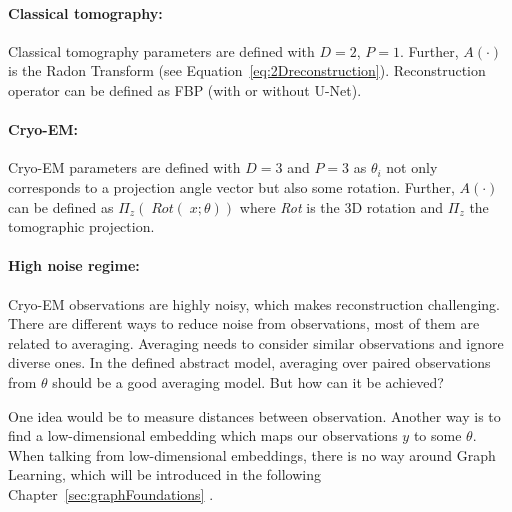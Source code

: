 \paragraph{Classical tomography:}

Classical tomography parameters are defined with $D=2$, $P=1$.
Further, $A(\cdot)$ is the Radon Transform (see Equation~\ref{eq:2Dreconstruction}).
Reconstruction operator can be defined as FBP (with or without U-Net\cite{unet-tomography}).

\paragraph{Cryo-EM:}
Cryo-EM parameters are defined with $D=3$ and $P=3$ as $\theta_i$ not only corresponds to
a projection angle vector but also some rotation.
Further, $A(\cdot)$ can be defined as $\Pi_z \left(\; \textit{Rot}(\;x; \theta) \right)$ 
where \textit{Rot} is the 3D rotation and $\Pi_z$ the tomographic projection.

\paragraph{High noise regime:}
Cryo-EM observations are highly noisy, which makes reconstruction challenging. 
There are different ways to reduce noise from observations, most of them are related to averaging. 
Averaging needs to consider similar observations and ignore diverse ones. 
In the defined abstract model, averaging over paired observations from $\theta$ should be a good averaging model.
But how can it be achieved? 

One idea would be to measure distances between observation.
Another way is to find a low-dimensional embedding which maps our observations $y$ to some $\theta$.
When talking from low-dimensional embeddings, there is no way around Graph Learning, which will be introduced
in the following Chapter~\ref{sec:graphFoundations} \textit{}.
